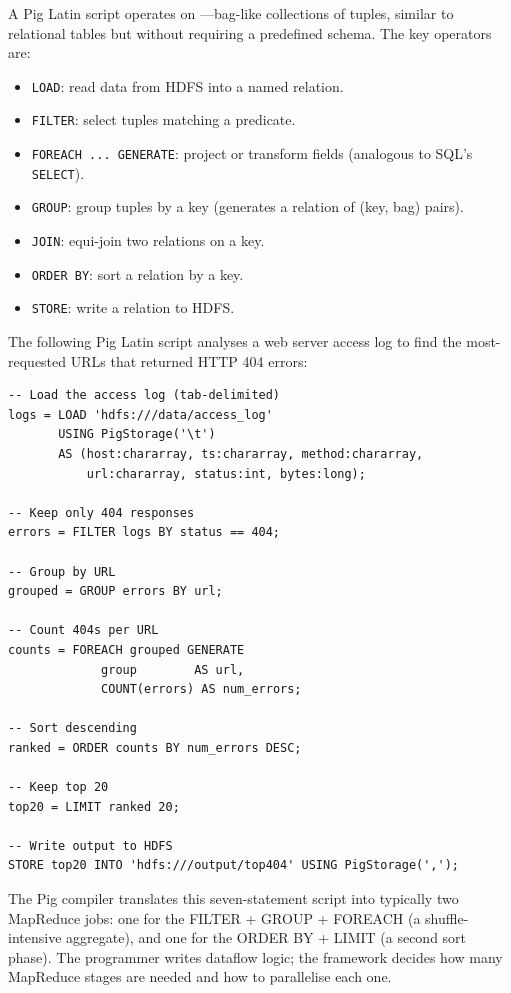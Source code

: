 A Pig Latin script operates on ---bag-like collections
of tuples, similar to relational tables but without requiring a
predefined schema. The key operators are:

\begin{itemize}
  \item \texttt{LOAD}: read data from HDFS into a named relation.
  \item \texttt{FILTER}: select tuples matching a predicate.
  \item \texttt{FOREACH ... GENERATE}: project or transform fields
        (analogous to SQL's \texttt{SELECT}).
  \item \texttt{GROUP}: group tuples by a key (generates a relation
        of (key, bag) pairs).
  \item \texttt{JOIN}: equi-join two relations on a key.
  \item \texttt{ORDER BY}: sort a relation by a key.
  \item \texttt{STORE}: write a relation to HDFS.
\end{itemize}

The following Pig Latin script analyses a web server access log to
find the most-requested URLs that returned HTTP 404 errors:

\begin{lstlisting}[style=pseudocode, caption={Pig Latin: 404 error frequency analysis}]
-- Load the access log (tab-delimited)
logs = LOAD 'hdfs:///data/access_log'
       USING PigStorage('\t')
       AS (host:chararray, ts:chararray, method:chararray,
           url:chararray, status:int, bytes:long);

-- Keep only 404 responses
errors = FILTER logs BY status == 404;

-- Group by URL
grouped = GROUP errors BY url;

-- Count 404s per URL
counts = FOREACH grouped GENERATE
             group        AS url,
             COUNT(errors) AS num_errors;

-- Sort descending
ranked = ORDER counts BY num_errors DESC;

-- Keep top 20
top20 = LIMIT ranked 20;

-- Write output to HDFS
STORE top20 INTO 'hdfs:///output/top404' USING PigStorage(',');
\end{lstlisting}

The Pig compiler translates this seven-statement script into
typically two MapReduce jobs: one for the FILTER + GROUP + FOREACH
(a shuffle-intensive aggregate), and one for the ORDER BY + LIMIT
(a second sort phase). The programmer writes dataflow logic; the
framework decides how many MapReduce stages are needed and how to
parallelise each one.

